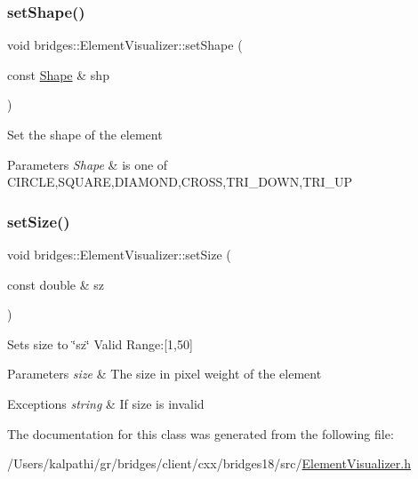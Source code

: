 \subsubsection{\texorpdfstring{set\+Shape()}{setShape()}}
{\footnotesize\ttfamily void bridges\+::\+Element\+Visualizer\+::set\+Shape (\begin{DoxyParamCaption}\item[{const \mbox{\hyperlink{namespacebridges_a1b4050586bd708782ae0d4f3b06b9579}{Shape}} \&}]{shp }\end{DoxyParamCaption})\hspace{0.3cm}{\ttfamily [inline]}}

Set the shape of the element


\begin{DoxyParams}{Parameters}
{\em Shape} & is one of C\+I\+R\+C\+LE,S\+Q\+U\+A\+RE,D\+I\+A\+M\+O\+ND,C\+R\+O\+SS,T\+R\+I\+\_\+\+D\+O\+WN,T\+R\+I\+\_\+\+UP \\
\hline
\end{DoxyParams}
\mbox{\label{classbridges_1_1_element_visualizer_a6fc924e754008992b310a89d8d88fce9}} 
\subsubsection{\texorpdfstring{set\+Size()}{setSize()}}
{\footnotesize\ttfamily void bridges\+::\+Element\+Visualizer\+::set\+Size (\begin{DoxyParamCaption}\item[{const double \&}]{sz }\end{DoxyParamCaption})\hspace{0.3cm}{\ttfamily [inline]}}

Sets size to \char`\"{}sz\char`\"{} Valid Range\+:\mbox{[}1,50\mbox{]}


\begin{DoxyParams}{Parameters}
{\em size} & The size in pixel weight of the element \\
\hline
\end{DoxyParams}

\begin{DoxyExceptions}{Exceptions}
{\em string} & If size is invalid \\
\hline
\end{DoxyExceptions}


The documentation for this class was generated from the following file\+:\begin{DoxyCompactItemize}
\item 
/\+Users/kalpathi/gr/bridges/client/cxx/bridges18/src/\mbox{\hyperlink{_element_visualizer_8h}{Element\+Visualizer.\+h}}\end{DoxyCompactItemize}
